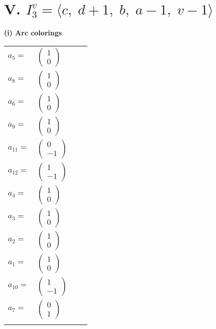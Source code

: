 \documentclass[1p]{elsarticle_modified}
\theoremstyle{definition}
\begin{document}
\centering \section*{V. $I^v_{3}= \langle c,\;d+1,\;b,\;a-1,\;v-1 \rangle$}
\flushleft \textbf{(i) Arc colorings}\\
\begin{tabular}{m{7pt} m{180pt} m{7pt} m{180pt} }
\flushright $a_{5}=$&$\begin{pmatrix}1\\0\end{pmatrix}$ \\
\flushright $a_{8}=$&$\begin{pmatrix}1\\0\end{pmatrix}$ \\
\flushright $a_{6}=$&$\begin{pmatrix}1\\0\end{pmatrix}$ \\
\flushright $a_{9}=$&$\begin{pmatrix}1\\0\end{pmatrix}$ \\
\flushright $a_{11}=$&$\begin{pmatrix}0\\-1\end{pmatrix}$ \\
\flushright $a_{12}=$&$\begin{pmatrix}1\\-1\end{pmatrix}$ \\
\flushright $a_{4}=$&$\begin{pmatrix}1\\0\end{pmatrix}$ \\
\flushright $a_{3}=$&$\begin{pmatrix}1\\0\end{pmatrix}$ \\
\flushright $a_{2}=$&$\begin{pmatrix}1\\0\end{pmatrix}$ \\
\flushright $a_{1}=$&$\begin{pmatrix}1\\0\end{pmatrix}$ \\
\flushright $a_{10}=$&$\begin{pmatrix}1\\-1\end{pmatrix}$ \\
\flushright $a_{7}=$&$\begin{pmatrix}0\\1\end{pmatrix}$\\&\end{tabular}
\end{document}
